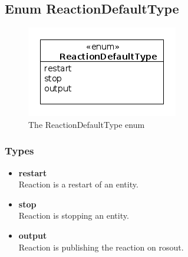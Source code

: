 \newpage
\subsection{Enum ReactionDefaultType}
\begin{figure}[htbp]
	\begin{minipage}[t]{8cm}
		\vspace{0pt}
		\centering
		\includegraphics[scale=0.6]{./diagram_pictures/reactor/ReactionDefaultType.png}
		\caption{The ReactionDefaultType enum}
	\end{minipage}
	\hfill
	\begin{minipage}[t]{8cm}
		\vspace{10pt}
			
	\end{minipage}
\end{figure}  


\subsubsection{Types}
\begin{itemize}
	\item \textbf{ restart }\\
		Reaction is a restart of an entity.
	\item \textbf{ stop }\\
		Reaction is stopping an entity.
	\item \textbf{ output }\\
		Reaction is publishing the reaction on rosout.
\end{itemize}


\newpage
